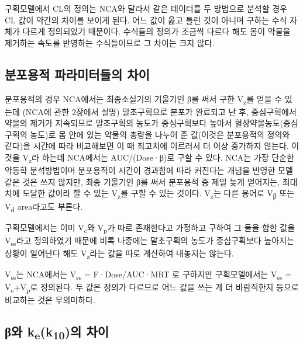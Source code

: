 \documentclass[
  11pt,
  krantz2, a4paper, twoside]{krantz}
\theoremstyle{definition}
\theoremstyle{definition}
\theoremstyle{definition}
\theoremstyle{definition}
\theoremstyle{remark}
\begin{document}
구획모델에서 CL의 정의는 NCA와 달라서 같은 데이터를 두 방법으로 분석할 경우 CL 값이 약간의 차이를 보이게 된다. 어느 값이 옳고 틀린 것이 아니며 구하는 수식 자체가 다르게 정의되었기 때문이다.
수식들의 정의가 조금씩 다르다 해도 몸이 약물을 제거하는 속도를 반영하는 수식들이므로 그 차이는 크지 않다.

\hypertarget{uxbd84uxd3ecuxc6a9uxc801-uxd30cuxb77cuxbbf8uxd130uxb4e4uxc758-uxcc28uxc774}{%
\subsection{\texorpdfstring{분포용적 파라미터들의 차이}{분포용적 파라미터들의 차이}}\label{uxbd84uxd3ecuxc6a9uxc801-uxd30cuxb77cuxbbf8uxd130uxb4e4uxc758-uxcc28uxc774}}

분포용적의 경우 NCA에서는 최종소실기의 기울기인 β를 써서 구한 V\textsubscript{z}를
얻을 수 있는데 (NCA에 관한 2장에서 설명) 말초구획으로 분포가 완료되고 난
후, 중심구획에서 약물의 제거가 지속되므로 말초구획의 농도가 중심구획보다
높아서 혈장약물농도(중심구획의 농도)로 몸 안에 있는 약물의 총량을 나누어
준 값(이것은 분포용적의 정의와 같다)을 시간에 따라 비교해보면 이 때
최고치에 이르러서 더 이상 증가하지 않는다. 이것을 V\textsubscript{z}라 하는데
NCA에서는 AUC/(Dose·β)로 구할 수 있다. NCA는 가장 단순한 약동학
분석방법이며 분포용적이 시간이 경과함에 따라 커진다는 개념을 반영한 모델
같은 것은 쓰지 않지만, 최종 기울기인 β를 써서 분포용적 중 제일 늦게
얻어지는, 최대치에 도달한 값이라 할 수 있는 V\textsubscript{z}를 구할 수 있는 것이다. V\textsubscript{z}는 다른
용어로 V\textsubscript{β} 또는 V\textsubscript{d} area라고도 부른다.

구획모델에서는 이미 V\textsubscript{c}와 V\textsubscript{p}가 따로 존재한다고 가정하고 구하여 그
둘을 합한 값을 V\textsubscript{ss}라고 정의하였기 때문에 비록 나중에는 말초구획의
농도가 중심구획보다 높아지는 상황이 일어난다 해도 V\textsubscript{z}라는 값을 따로
계산하여 내놓지는 않는다.

V\textsubscript{ss}는 NCA에서는 V\textsubscript{ss} = F·Dose/AUC·MRT 로 구하지만 구획모델에서는
V\textsubscript{ss} = V\textsubscript{c}+V\textsubscript{p}로 정의된다. 두 값은 정의가 다르므로 어느 값을 쓰는 게
더 바람직한지 등으로 비교하는 것은 무의미하다.

\hypertarget{ux3b2uxc640-kek10uxc758-uxcc28uxc774}{%
\subsection{\texorpdfstring{β와 k\textsubscript{e}(k\textsubscript{10})의 차이}{β와 ke(k10)의 차이}}\label{ux3b2uxc640-kek10uxc758-uxcc28uxc774}}
\end{document}

